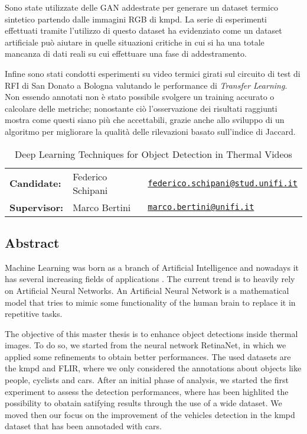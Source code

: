 \documentclass[11pt]{article}
\begin{document}
Sono state utilizzate delle \acrfull{GAN} addestrate per generare un dataset termico sintetico partendo dalle immagini RGB di \acrshort{kmpd}. La serie di esperimenti effettuati tramite l'utilizzo di questo dataset ha evidenziato come un dataset artificiale può aiutare in quelle situazioni critiche in cui si ha una totale mancanza di dati reali su cui effettuare una fase di addestramento.

Infine sono stati condotti esperimenti su video termici girati sul circuito di test di \acrfull{RFI} di San Donato a Bologna valutando le performance di \textit{Transfer Learning}. Non essendo annotati non è stato possibile svolgere un training accurato o calcolare delle metriche; nonostante ciò l'osservazione dei risultati raggiunti mostra come questi siano più che accettabili, grazie anche allo sviluppo di un algoritmo per migliorare la qualità delle rilevazioni basato sull'indice di Jaccard.

\newpage
\begin{table}[]
    \centering
    \caption*{Deep Learning Techniques for Object Detection in Thermal Videos}
    \begin{tabular}{lll}
    \textbf{Candidate:}   & Federico Schipani & \href{mailto:federico.schipani@stud.unifi.it}{\texttt{federico.schipani@stud.unifi.it}}  \\
    \textbf{Supervisor:}    & Marco Bertini  & \href{mailto:marco.bertini@unifi.it}{\texttt{marco.bertini@unifi.it}}                           \\
    \end{tabular}
    \end{table}
    \subsection*{Abstract}
    Machine Learning was born as a branch of Artificial Intelligence and nowadays it has several increasing fields of applications . The current trend is to heavily rely on Artificial Neural Networks. An Artificial Neural Network is a mathematical model that tries to mimic some functionality of the human brain to replace it in repetitive tasks.

    The objective of this master thesis is to enhance object detections inside thermal images. To do so, we started from the neural network RetinaNet, in which we applied some refinements to obtain better performances. The used datasets are the \acrfull{kmpd} and FLIR, where we only considered the annotations about objects like people, cyclists and cars. After an initial phase of analysis, we started the first experiment to assess the detection performances, where has been highlited the possibility to obatain satifying results through the use of a wide dataset. We moved then our focus on the improvement of the vehicles detection in the \acrshort{kmpd} dataset that has been annotaded with cars.
\end{document}
